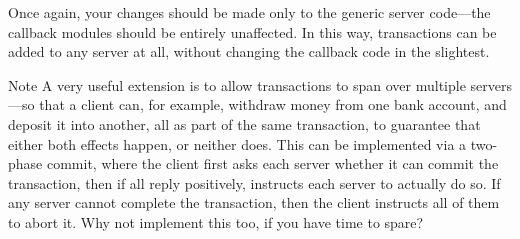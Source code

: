 \documentclass{article}
\begin{document}
Once again, your changes should be made only to the generic server code—the callback modules should be entirely unaffected. In this way, transactions can be added to any server at all, without changing the callback code in the slightest.

Note
A very useful extension is to allow transactions to span over multiple servers—so that a client can, for example, withdraw money from one bank account, and deposit it into another, all as part of the same transaction, to guarantee that either both effects happen, or neither does. This can be implemented via a two-phase commit, where the client first asks each server whether it can commit the transaction, then if all reply positively, instructs each server to actually do so. If any server cannot complete the transaction, then the client instructs all of them to abort it. Why not implement this too, if you have time to spare?
\end{document}
